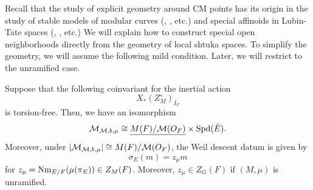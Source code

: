 \documentclass[12pt,reqno]{amsart}
\begin{document}
Recall that the study of explicit geometry around CM points has its origin in the study of stable models of modular curves (\cite{DR73}, \cite{Wei16}, etc.) and special affinoids in Lubin-Tate spaces (\cite{Yos10}, \cite{BW16}, etc.) We will explain how to construct special open neighborhoods directly from the geometry of local shtuka spaces. To simplify the geometry, we will assume the following mild condition. Later, we will restrict to the unramified case. 

\begin{lem} \label{lem:zero_dimensional_LSV}
    Suppose that the following coinvariant for the inertial action 
    \[
        X_*(Z_M^\circ)_{I_F}
    \]
    is torsion-free. Then, we have an isomorphism 
    \[
        {\mathcal{M}}_{{\mathcal{M}}, b, \mu} \cong {\underline{M(F) / {\mathcal{M}}(O_F)}} \times {\operatorname{Spd}}(\breve{E}). 
    \]
    Moreover, under $\lvert {\mathcal{M}}_{{\mathcal{M}}, b, \mu} \rvert\cong M(F) / {\mathcal{M}}(O_F)$, the Weil descent datum is given by 
    \[
        \sigma_E(m) = z_\mu m
    \]
    for $z_\mu = {\operatorname{Nm}}_{E/ F}(\mu(\pi_E)) \in Z_M(F)$. Moreover, $z_\mu \in Z_G(F)$ if $(M, \mu)$ is unramified. 
\end{lem}
\end{document}
